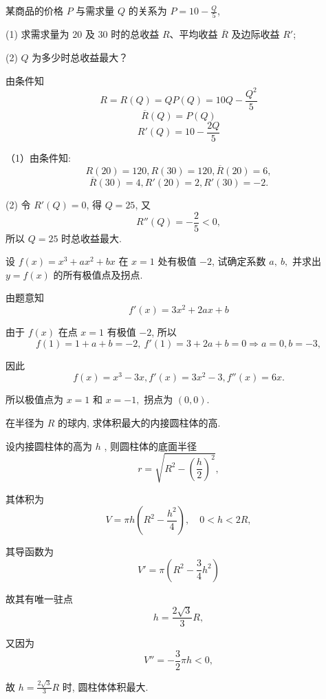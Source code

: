 \begin{problem} 某商品的价格 $P$ 与需求量 $Q$ 的关系为 $\displaystyle P = 10 - \frac{Q}{5}$,

(1) 求需求量为 $20$ 及 $30$ 时的总收益 $R$、平均收益
$\overline{R}$ 及边际收益 $R'$;

(2) $Q$ 为多少时总收益最大？

\begin{solution}
由条件知
$$R = R\left( Q \right) = QP\left( Q \right) = 10Q - \frac{Q^{2}}{5}$$
$$\overline{R}\left( Q \right) = P\left( Q \right)$$
$$R'\left( Q \right) = 10 - \frac{2Q}{5}$$

（1）由条件知:
$$R\left( 20 \right) = 120,R\left( 30 \right) = 120,\overline{R}\left( 20 \right) = 6,$$
$$\overline{R}\left( 30 \right) = 4,R'\left( 20 \right) = 2,R'\left( 30 \right) = - 2.$$

(2) 令 $R'\left( Q \right) = 0$, 得 $Q = 25$, 又
$$R''\left( Q \right) = - \frac{2}{5} < 0,$$ 所以 $Q = 25$
时总收益最大.
\end{solution}

\end{problem}           

\begin{problem} 设 $f\left( x \right) = x^{3} + ax^{2} + bx$ 在 $x = 1$ 处有极值
$- 2$, 试确定系数 $a,\ b,$ 并求出 $y = f\left( x \right)$
的所有极值点及拐点.

\begin{solution} 由题意知
$$f'\left( x \right) = 3x^{2} + 2ax + b$$

由于 $f\left( x \right)$ 在点 $x = 1$ 有极值 $- 2$, 所以
$$f\left( 1 \right) = 1 + a + b = - 2,\ f'\left( 1 \right) = 3 + 2a + b = 0 \Rightarrow a = 0,b = - 3,$$

因此
$$f\left( x \right) = x^{3} - 3x,f'\left( x \right) = 3x^{2} - 3,f''\left( x \right) = 6x.$$

所以极值点为 $x = 1$ 和 $x = - 1,$ 拐点为 $(0, 0).$
\end{solution}

\end{problem}           

\begin{problem} 在半径为 $R$ 的球内, 求体积最大的内接圆柱体的高.

\begin{solution} 设内接圆柱体的高为 $h$ , 则圆柱体的底面半径
$$r = \sqrt{R^{2} - \left( \frac{h}{2} \right)^{2}},$$

其体积为
$$V = \pi h\left( R^{2} - \frac{h^{2}}{4} \right),\quad 0 < h < 2R,$$

其导函数为
$$V' = \pi\left( R^{2} - \frac{3}{4}h^{2} \right)$$

故其有唯一驻点
$$h = \frac{2\sqrt{3}}{3}R,$$

又因为
$$V'' = - \frac{3}{2}\pi h < 0,$$

故 $\displaystyle h = \frac{2\sqrt{3}}{3}R$ 时, 圆柱体体积最大.
\end{solution}

\end{problem}           

